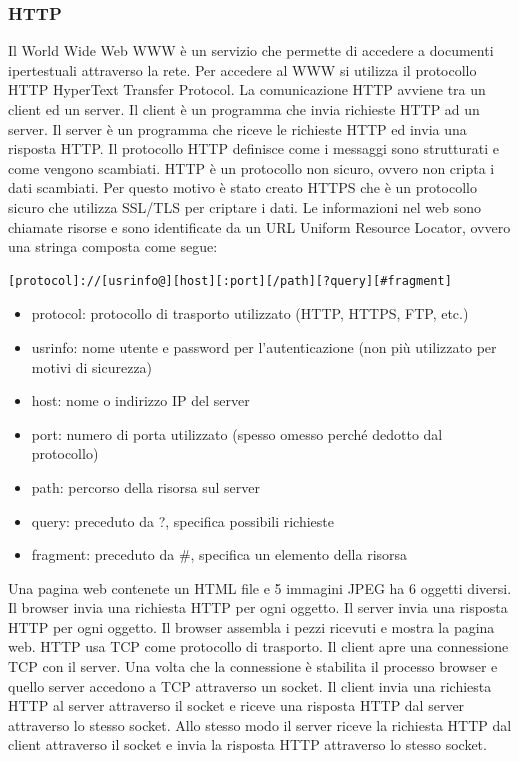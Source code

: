 \documentclass[12pt]{article}
\begin{document}
\subsubsection{HTTP}
Il World Wide Web WWW è un servizio che permette di accedere a documenti ipertestuali attraverso la rete.
Per accedere al WWW si utilizza il protocollo HTTP HyperText Transfer Protocol.
La comunicazione HTTP avviene tra un client ed un server.
Il client è un programma che invia richieste HTTP ad un server.
Il server è un programma che riceve le richieste HTTP ed invia una risposta HTTP.
Il protocollo HTTP definisce come i messaggi sono strutturati e come vengono scambiati.
HTTP è un protocollo non sicuro, ovvero non cripta i dati scambiati.
Per questo motivo è stato creato HTTPS che è un protocollo sicuro che utilizza SSL/TLS per criptare i dati.
Le informazioni nel web sono chiamate risorse e sono identificate da un URL Uniform Resource Locator, ovvero una stringa composta come segue:
\begin{verbatim}
[protocol]://[usrinfo@][host][:port][/path][?query][#fragment]
\end{verbatim}
\begin{itemize}
    \item protocol: protocollo di trasporto utilizzato (HTTP, HTTPS, FTP, etc.)
    \item usrinfo: nome utente e password per l'autenticazione (non più utilizzato per motivi di sicurezza)
    \item host: nome o indirizzo IP del server
    \item port: numero di porta utilizzato (spesso omesso perché dedotto dal protocollo)
    \item path: percorso della risorsa sul server
    \item query: preceduto da ?, specifica possibili richieste
    \item fragment: preceduto da \#, specifica un elemento della risorsa
\end{itemize}
Una pagina web contenete un HTML file e 5 immagini JPEG ha 6 oggetti diversi.
Il browser invia una richiesta HTTP per ogni oggetto.
Il server invia una risposta HTTP per ogni oggetto.
Il browser assembla i pezzi ricevuti e mostra la pagina web.
HTTP usa TCP come protocollo di trasporto.
Il client apre una connessione TCP con il server. Una volta che la connessione è stabilita il processo browser e quello server accedono a TCP attraverso un socket.
Il client invia una richiesta HTTP al server attraverso il socket e riceve una risposta HTTP dal server attraverso lo stesso socket. Allo stesso modo il server riceve la richiesta HTTP dal client attraverso il socket e invia la risposta HTTP attraverso lo stesso socket.
\end{document}
